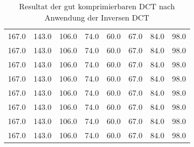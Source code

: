 \begin{table}
\begin{tabular}{|c|c|c|c|c|c|c|c|}
	\hline
	167.0 & 143.0 & 106.0 & 74.0 & 60.0 & 67.0 & 84.0 & 98.0 \\
	167.0 & 143.0 & 106.0 & 74.0 & 60.0 & 67.0 & 84.0 & 98.0 \\
	167.0 & 143.0 & 106.0 & 74.0 & 60.0 & 67.0 & 84.0 & 98.0 \\
	167.0 & 143.0 & 106.0 & 74.0 & 60.0 & 67.0 & 84.0 & 98.0 \\
	167.0 & 143.0 & 106.0 & 74.0 & 60.0 & 67.0 & 84.0 & 98.0 \\
	167.0 & 143.0 & 106.0 & 74.0 & 60.0 & 67.0 & 84.0 & 98.0 \\
	167.0 & 143.0 & 106.0 & 74.0 & 60.0 & 67.0 & 84.0 & 98.0 \\
	167.0 & 143.0 & 106.0 & 74.0 & 60.0 & 67.0 & 84.0 & 98.0 \\
	\hline
\end{tabular}
\caption{Resultat der gut komprimierbaren DCT nach Anwendung der Inversen DCT}
\end{table}
